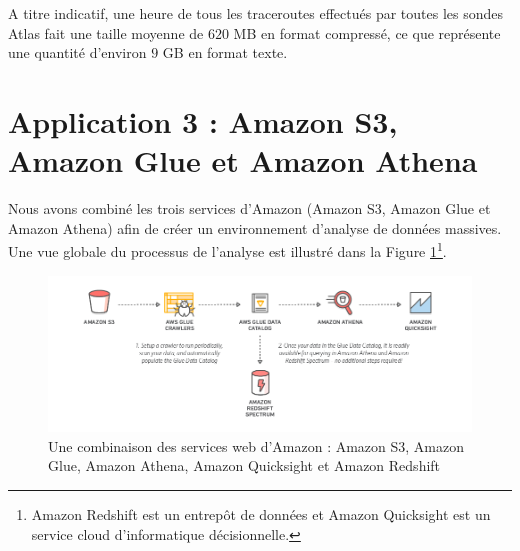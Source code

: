  A titre indicatif, une heure de tous les traceroutes effectués par toutes les sondes Atlas fait une taille moyenne de  $620$ MB en format compressé, ce que représente une quantité d'environ $9$ GB en format texte.






\section{Application 3 : Amazon S3, Amazon Glue  et Amazon Athena }



Nous avons combiné les trois services d'Amazon (Amazon S3, Amazon Glue  et Amazon Athena)  afin de créer un environnement d'analyse de données massives. Une vue globale du  processus de l'analyse  est illustré dans la Figure \ref{fig:gluecrawler}\footnote{Amazon Redshift  est un entrepôt de données et  Amazon Quicksight  est un service cloud d'informatique décisionnelle.}. 

\begin{figure}[H]
	\centering
	\captionsetup{justification=centering}
	\includegraphics[width=1\linewidth]{illustrations/glue_crawler}
	\caption{Une combinaison des services web d'Amazon : Amazon S3, Amazon Glue, Amazon Athena, Amazon Quicksight  et Amazon Redshift}
	\label{fig:gluecrawler}
\end{figure}



